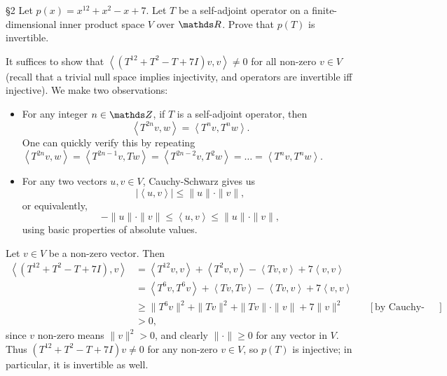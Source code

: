 \documentclass{homework}
\begin{document}
\begin{problem}{\S 2}
  Let $p(x)=x^{12}+x^2-x+7$. Let $T$ be a self-adjoint operator on a finite-dimensional inner
  product space $V$ over $\R$. Prove that $p(T)$ is invertible.
\end{problem}
\begin{solution}
  It suffices to show that $\left<(T^{12}+T^2-T+7I)v,v \right>\neq 0 $ for all non-zero $v\in V$
  (recall that a trivial null space implies injectivity, and operators are invertible iff
  injective). We make two observations:
  \begin{itemize}
    \item For any integer $n\in \Z$, if $T$ is a self-adjoint operator, then \[
        \left<T^{2n}v,w \right> =\left<T^{n}v,T^{n}w \right> 
      .\] One can quickly verify this by repeating $\left<T^{2n}v,w \right> =\left<T^{2n-1}v,Tw
      \right> =\left<T^{2n-2}v,T^2w \right> =\ldots=\left<T^{n}v,T^{n}w \right> $.
    \item For any two vectors $u,v\in V$, Cauchy-Schwarz gives us \[
      \left| \left<u,v \right> \right| \le \|u\|\cdot \|v\|
    ,\] or equivalently, \[
      -\|u\|\cdot \|v\|\le \left<u,v \right> \le \|u\|\cdot \|v\|
    ,\] using basic properties of absolute values.
  \end{itemize}

  Let $v\in V$ be a non-zero vector. Then
  \begin{align*}
    \left<\left( T^{12}+T^2-T+7I \right),v  \right> &= \left<T^{12}v,v \right> +\left<T^2v,v
    \right> -\left<Tv,v \right> +7\left<v,v \right>  \\
                                                    &= \left<T^6v,T^6v \right>+\left<Tv,Tv \right>
    -\left<Tv,v \right> +7\left<v,v \right>   \\
                                                    &\ge \|T^6v\|^2+\|Tv\|^2+\|Tv\|\cdot
    \|v\|+7\|v\|^2&&[\text{by Cauchy-Schwarz; see observation}]\\
    &>0
  ,\end{align*} since $v$ non-zero means $\|v\|^2>0$, and clearly $\|\cdot \|\ge 0$ for any vector
  in $V$. Thus $(T^{12}+T^2-T+7I)v\neq 0$ for any non-zero $v\in V$, so $p(T)$ is injective; in
  particular, it is invertible as well.
\end{solution}
\end{document}
